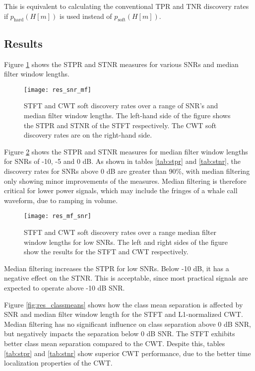 This is equivalent to calculating the conventional TPR and TNR discovery rates if $p_\text{hard}(H[m])$ is used instead of $p_\text{soft}(H[m])$.
 
 \subsection{Results}
 \label{sec:fmsweep} 

Figure \ref{fig:res_snr_mf} shows the STPR and STNR measures for various SNRs and median filter window lengths.
 
 \begin{figure}[h!]
 	\centering
 	\texttt{[image: res\_snr\_mf]}
 	\caption[STFT and CWT soft discovery rates over SNR.]{STFT and CWT soft discovery rates over a range of SNR's and median filter window lengths. The left-hand side of the figure shows the STPR and STNR of the STFT respectively. The CWT soft discovery rates are on the right-hand side.}
 	\label{fig:res_snr_mf}
 \end{figure}


Figure \ref{fig:res_mf_snr} shows the STPR and STNR measures for median filter window lengths for SNRs of -10, -5 and 0 dB. As shown in tables \ref{tab:stpr} and \ref{tab:stnr}, the discovery rates for SNRs above 0 dB are greater than 90\%, with median filtering only showing minor improvements of the measures. Median filtering is therefore critical for lower power signals, which may include the fringes of a whale call waveform, due to ramping in volume.

 \begin{figure}[h!]
	\centering
	\texttt{[image: res\_mf\_snr]}
	\caption[STFT and CWT soft discovery rates over median filter length.]{STFT and CWT soft discovery rates over a range median filter window lengths for low SNRs. The left and right sides of the figure show the results for the STFT and CWT respectively.}
	\label{fig:res_mf_snr}
\end{figure}

Median filtering increases the STPR for low SNRs. Below -10 dB, it has a negative effect on the STNR. This is acceptable, since most practical signals are expected to operate above -10 dB SNR.

Figure \ref{fig:res_classmeans} shows how the class mean separation is affected by SNR and median filter window length for the STFT and L1-normalized CWT. Median filtering has no significant influence on class separation above 0 dB SNR, but negatively impacts the separation below 0 dB SNR. The STFT exhibits better class mean separation compared to the CWT. Despite this, tables \ref{tab:stpr} and \ref{tab:stnr} show superior CWT performance, due to the better time localization properties of the CWT.

